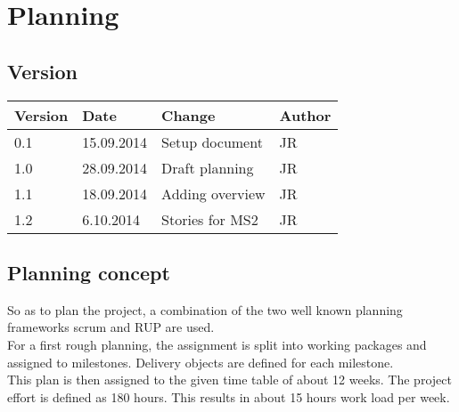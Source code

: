 


\chapter{Planning} %

\label{Planning} %



\section{Version}

\begin{tabular}{| p{1.5cm} | p{2cm} | p{9cm} | p{1.5cm} |}
    \hline
    Version & Date      & Change & Author \\ \hline
    0.1     & 15.09.2014        & Setup document                                        & JR \\ \hline
    1.0     & 28.09.2014        & Draft planning                                        & JR \\ \hline
    1.1     & 18.09.2014        & Adding overview                                       & JR \\ \hline
    1.2     & 6.10.2014        & Stories for MS2                                       & JR \\ \hline

\end{tabular}

\section{Planning concept}

So as to plan the project, a combination of the two well known planning frameworks scrum and RUP are used.\\
For a first rough planning, the assignment is split into working packages and assigned to milestones. Delivery objects are defined for each milestone.\\
This plan is then assigned to the given time table of about 12 weeks. The project effort is defined as 180 hours. This results in about 15 hours work load per week.

